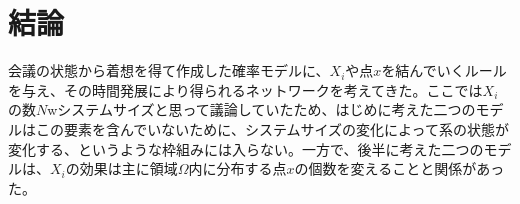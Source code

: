 \chapter{結論}

会議の状態から着想を得て作成した確率モデルに、$X_{i}$や点$x$を結んでいくルールを与え、その時間発展により得られるネットワークを考えてきた。ここでは$X_{i}$の数$N$wシステムサイズと思って議論していたため、はじめに考えた二つのモデルはこの要素を含んでいないために、システムサイズの変化によって系の状態が変化する、というような枠組みには入らない。一方で、後半に考えた二つのモデルは、$X_{i}$の効果は主に領域$\Omega$内に分布する点$x$の個数を変えることと関係があった。

